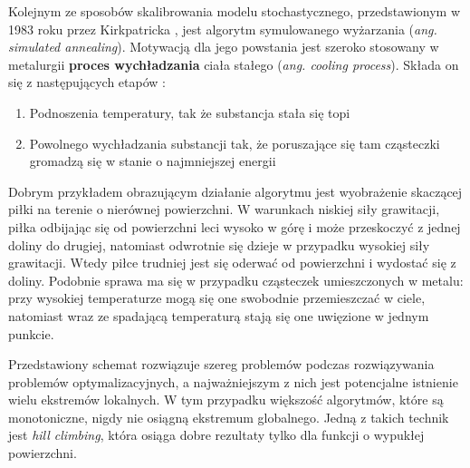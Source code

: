 \documentclass{pracamgr}
\begin{document}
Kolejnym ze sposobów skalibrowania modelu stochastycznego, przedstawionym w 1983 roku przez Kirkpatricka \cite{Kirkpatrick}, jest algorytm symulowanego wyżarzania  (\textit{ang. simulated annealing}). Motywacją dla jego powstania jest szeroko stosowany w metalurgii \textbf{proces wychładzania} ciała stałego (\textit{ang. cooling process}). Składa on się z następujących etapów \cite{ChenBin}:

\begin{enumerate}
  \item Podnoszenia temperatury, tak że substancja stała się topi
  \item Powolnego wychładzania substancji tak, że poruszające się tam cząsteczki gromadzą się w stanie o najmniejszej energii
\end{enumerate}

Dobrym przykładem obrazującym działanie algorytmu jest wyobrażenie skaczącej piłki na terenie 
o nierównej powierzchni.
W warunkach niskiej siły grawitacji, piłka odbijając się od powierzchni leci wysoko w górę i może przeskoczyć z jednej doliny do drugiej, natomiast odwrotnie się dzieje w przypadku wysokiej siły grawitacji. Wtedy piłce trudniej jest się oderwać od powierzchni i wydostać się z doliny. Podobnie sprawa ma się w przypadku cząsteczek umieszczonych w metalu: przy wysokiej 
temperaturze mogą się one swobodnie przemieszczać w ciele, natomiast wraz ze spadającą temperaturą 
stają się one uwięzione w jednym punkcie.

Przedstawiony schemat rozwiązuje szereg problemów podczas rozwiązywania problemów optymalizacyjnych, a najważniejszym z nich jest potencjalne istnienie wielu ekstremów lokalnych.
W tym przypadku większość algorytmów, które są monotoniczne, nigdy nie osiągną ekstremum globalnego. Jedną z takich technik jest \textit{hill climbing}, która osiąga dobre rezultaty tylko dla funkcji o wypukłej powierzchni.

\end{document}

